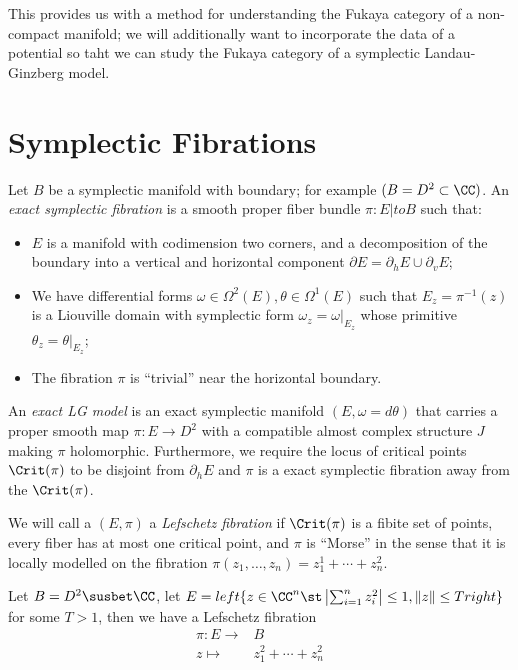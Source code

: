 This provides us with a method for understanding the Fukaya category of a non-compact manifold; we will additionally want to incorporate the data of a potential so taht we can study the Fukaya category of a symplectic Landau-Ginzberg model. 
\section{Symplectic Fibrations}
\begin{definition}
  \label{def:exactSymplecticFibration}
  Let $B$ be a symplectic manifold with boundary; for example $(B=D^2\subset \CC)$. 
  An \emph{exact symplectic fibration} is a smooth proper fiber bundle $\pi: E|to B$ such that:
  \begin{itemize}
  \item $E$ is a manifold with codimension two corners, and a decomposition of the boundary into a vertical and horizontal component $\partial E= \partial_h E\cup \partial_v E$;
  \item We have differential forms $\omega\in \Omega^2(E), \theta\in \Omega^1(E)$ such that $E_z=\pi^{-1}(z)$ is a Liouville domain with symplectic form $\omega_z=\omega|_{E_z}$ whose primitive $\theta_z=\theta|_{E_z}$;
  \item The fibration $\pi$ is ``trivial'' near the horizontal boundary.
  \end{itemize}
\end{definition}
\begin{definition}
\label{def:exactLGModel}
An \emph{exact LG model} is an exact symplectic manifold $(E, \omega=d\theta)$ that carries a proper smooth map $\pi: E\to D^2$ with a compatible almost complex structure $J$ making $\pi$ holomorphic. Furthermore, we require the locus of critical points $\Crit(\pi)$ to be disjoint from $\partial_h E$ and $\pi$ is a exact symplectic fibration away from the $\Crit(\pi)$. 
\end{definition}
\begin{definition}
  \label{def:lefschetzFibration}
We will call a  $(E, \pi)$ a \emph{Lefschetz fibration} if $\Crit(\pi)$ is a fibite set of points, every fiber has at most one critical point, and $\pi$ is ``Morse'' in the sense that it is locally modelled on the fibration $\pi(z_1, \ldots, z_n)= z_1^1+\cdots + z_n^2$. 
\end{definition}
\begin{example}
Let $B=D^2\susbet \CC$, let $E=left\{ z\in \CC^n \st \left|\sum_{i=1}^n z_i^2\right|\leq 1, \|z\|\leq Tright\}$ for some $T>1$, then we have a Lefschetz fibration 
\begin{align*}
\pi: E\to &B\\
z\mapsto & z_1^2+\cdots + z_n^2
\end{align*}
\end{example}
